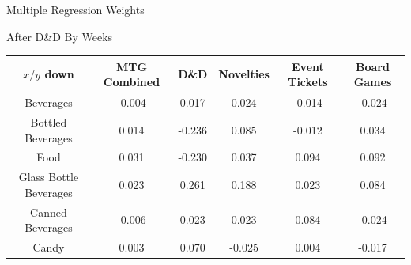 \documentclass[compress,blue]{beamer}
\begin{document}
\begin{frame}{Multiple Regression Weights}
\begin{center}
\tiny
\begin{center}After D\&D By Weeks\end{center}
\vspace{0.3cm}
\tiny
\begin{tabular}{| c | c | c | c | c | c |}
 $x/y$ down & MTG Combined  & D\&D  & Novelties  & Event Tickets  & Board
 Games\\ 
 \hline 
 \hline
 Beverages & {\color{blue}-0.004} & {\color{blue}0.017} &
 {\color{blue}0.024} & {\color{blue}-0.014} & {\color{blue}-0.024} \\
 \hline
 Bottled Beverages & {\color{blue}0.014} & {\color{orange}-0.236} &
 {\color{blue}0.085} & {\color{blue}-0.012} & {\color{blue}0.034} \\
 \hline
 Food & {\color{blue}0.031} & {\color{orange}-0.230} &
 {\color{blue}0.037} & {\color{blue}0.094} & {\color{blue}0.092} \\
 \hline
 Glass Bottle Beverages & {\color{blue}0.023} & {\color{orange}0.261} &
 {\color{orange}0.188} & {\color{blue}0.023} & {\color{blue}0.084} \\
 \hline
 Canned Beverages & {\color{blue}-0.006} & {\color{blue}0.023} &
 {\color{blue}0.023} & {\color{blue}0.084} & {\color{blue}-0.024} \\
 \hline
 Candy & {\color{blue}0.003} & {\color{blue}0.070} &
 {\color{blue}-0.025} & {\color{blue}0.004} & {\color{blue}-0.017} \\
 \hline 
\end{tabular}

\vspace{-.27cm}

\begin{center}


\end{center}
\end{center}
\end{frame}
\end{document}
